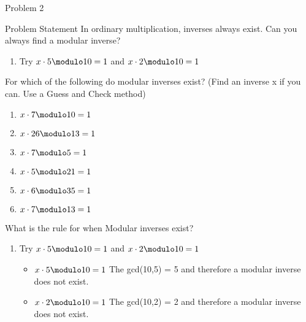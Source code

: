 \begin{problem}{Problem 2}
    \begin{statement}{Problem Statement}
        In ordinary multiplication, inverses always exist. Can you always find a modular inverse?

        \begin{enumerate}[label = (\alph*)]
            \item Try $x \cdot 5 \modulo 10 = 1$ and $x \cdot 2 \modulo 10 = 1$
        \end{enumerate}
        For which of the following do modular inverses exist? (Find an inverse x if you can. Use a Guess and Check method)

        \begin{enumerate}[label = (\alph*), start = 2]
            \item $x \cdot 7 \modulo 10 = 1$
            \item $x \cdot 26 \modulo 13 = 1$
            \item $x \cdot 7 \modulo 5 = 1$
            \item $x \cdot 5 \modulo 21 = 1$
            \item $x \cdot 6 \modulo 35 = 1$
            \item $x \cdot 7 \modulo 13 = 1$
        \end{enumerate}
        What is the rule for when Modular inverses exist?
    \end{statement}

    \begin{Highlight}
        \begin{enumerate}[label = (\alph*)]
            \item Try $x \cdot 5 \modulo 10 = 1$ and $x \cdot 2 \modulo 10 = 1$
            \begin{itemize}
                \item $x \cdot 5 \modulo 10 = 1$ \hspace*{10pt} The gcd(10,5) = 5 and therefore a modular inverse does not exist.
                \item $x \cdot 2 \modulo 10 = 1$ \hspace*{10pt} The gcd(10,2) = 2 and therefore a modular inverse does not exist.
            \end{itemize}
        \end{enumerate}
    \end{Highlight}


\end{problem}

